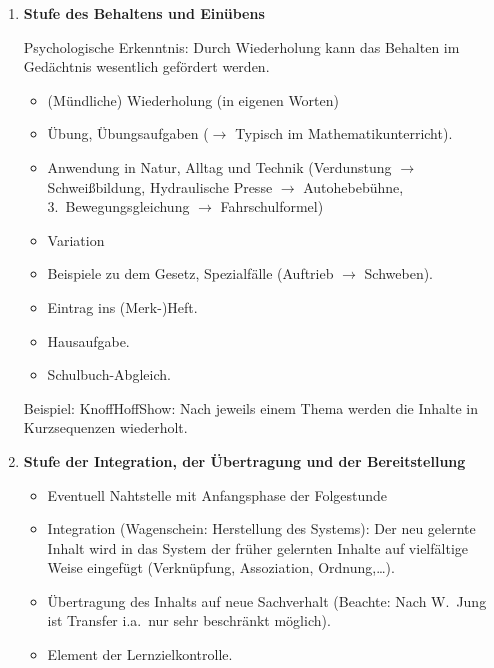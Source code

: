 \begin{enumerate}
	\item {\bf Stufe des Behaltens und Ein\"{u}bens}
	
	Psychologische Erkenntnis:
	Durch Wiederholung kann das Behalten im
	Ged\"{a}chtnis wesentlich gef\"{o}rdert werden.
	
	\begin{itemize}
		\item (M\"{u}ndliche) Wiederholung (in eigenen Worten)
		\item \"{U}bung, \"{U}bungsaufgaben
		($\to$ Typisch im Mathematikunterricht).
		\item Anwendung in Natur, Alltag und Technik (Verdunstung $\to$
		Schwei{\ss}bildung, Hydraulische Presse $\to$ Autohebeb\"{u}hne,
		3.\ Bewegungsgleichung $\to$ Fahrschulformel)
		\item Variation
		\item Beispiele zu dem Gesetz,
		Spezialf\"{a}lle (Auftrieb $\to$ Schweben).
		\item Eintrag ins (Merk-)Heft.
		\item Hausaufgabe.
		\item Schulbuch-Abgleich.
	\end{itemize}
	
	Beispiel: KnoffHoffShow:
	Nach jeweils einem Thema werden die Inhalte in
	Kurzsequenzen wiederholt.
	
	\item {\bf Stufe der Integration, der \"{U}bertragung und
	der Bereitstellung}
	
	\begin{itemize}
		\item Eventuell Nahtstelle mit Anfangsphase der Folgestunde
		\item Integration (Wagenschein: Herstellung des Systems):
		Der neu gelernte Inhalt wird in das System der fr\"{u}her
		gelernten Inhalte auf vielf\"{a}ltige Weise
		eingef\"{u}gt (Verkn\"{u}pfung, Assoziation, Ordnung,\dots).
		\item \"{U}bertragung des Inhalts auf neue Sachverhalt
		(Beachte: Nach W.\ Jung ist Transfer i.a.\ nur sehr
		beschr\"{a}nkt m\"{o}glich).
		\item Element der Lernzielkontrolle.
	\end{itemize}
\end{enumerate}
	
